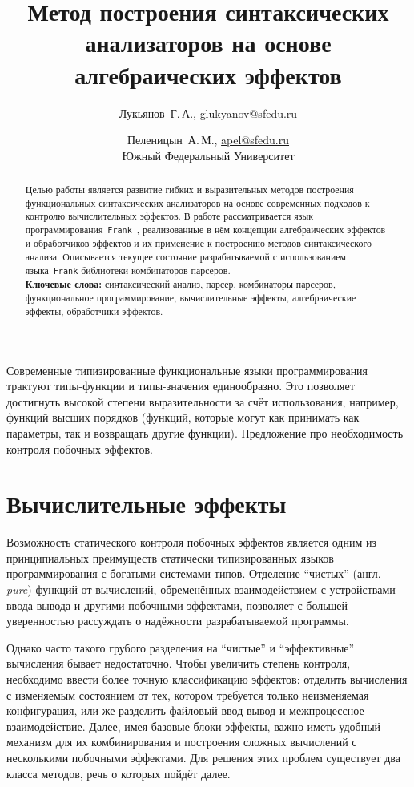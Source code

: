 \documentclass [a4paper] {article}
\title %
  {Метод построения синтаксических анализаторов
   на основе алгебраических эффектов}
\author %
{%
  Лукьянов~Г.\,А., \url {glukyanov@sfedu.ru} \and %
  Пеленицын~А.\,М., \url {apel@sfedu.ru} \\
  Южный Федеральный Университет
}%
\date {}    %
\begin{document}

\maketitle

\begin {abstract}
  Целью работы является развитие гибких и выразительных методов построения
  функциональных синтаксических анализаторов на основе современных подходов
  к контролю вычислительных эффектов. В работе рассматривается язык
  программирования~\texttt{Frank}~\cite{Frank}, реализованные в нём концепции
  алгебраических эффектов и обработчиков эффектов и их применение к построению
  методов синтаксического анализа. Описывается текущее состояние
  разрабатываемой с использованием языка~\texttt{Frank} библиотеки комбинаторов
  парсеров.
  \\ \textbf {Ключевые слова:} синтаксический анализ, парсер,
  комбинаторы парсеров, функциональное программирование, вычислительные эффекты,
  алгебраические эффекты, обработчики эффектов.
\end {abstract}


Современные типизированные функциональные языки программирования трактуют
типы-функции и типы-значения единообразно. Это позволяет достигнуть высокой
степени выразительности за счёт использования, например, функций высших
порядков (функций, которые могут как принимать как параметры, так и
возвращать другие функции). Предложение про необходимость контроля побочных
эффектов.

\section{Вычислительные эффекты}

Возможность статического контроля побочных эффектов является одним из
принципиальных преимуществ статически типизированных языков
программирования с богатыми системами типов. Отделение ``чистых''
(англ. \emph{pure}) функций от вычислений, обременённых
взаимодействием с устройствами ввода-вывода и другими побочными
эффектами, позволяет с большей уверенностью рассуждать о надёжности
разрабатываемой программы.

Однако часто такого грубого разделения на ``чистые'' и ``эффективные''
вычисления бывает недостаточно. Чтобы увеличить степень контроля, необходимо
ввести более точную классификацию эффектов: отделить вычисления с изменяемым
состоянием от тех, котором требуется только неизменяемая конфигурация, или же
разделить файловый ввод-вывод и межпроцессное взаимодействие. Далее, имея
базовые блоки-эффекты, важно иметь удобный механизм для их комбинирования и
построения сложных вычислений с несколькими побочными эффектами. Для решения
этих проблем существует два класса методов, речь о которых пойдёт далее.
\end{document}
